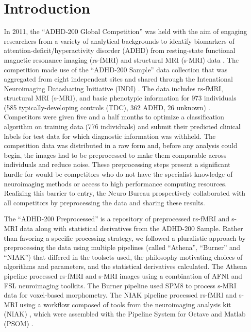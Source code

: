 \documentclass[preprint,12pt,3p]{elsarticle}
\begin{document}
\section{Introduction}

In 2011, the ``ADHD-200 Global Competition'' was held with the aim of engaging researchers from a variety of analytical backgrounds to identify biomarkers of attention-deficit/hyperactivity disorder (ADHD) from resting-state functional magnetic resonance imaging (rs-fMRI) and structural MRI (s-MRI) data \cite{Milham2012}. The competition made use of the ``ADHD-200 Sample'' data collection that was aggregated from eight independent sites and shared through the Intenational Neuroimaging Datasharing Initiative (INDI) \cite{Mennes2013}. The data includes rs-fMRI, structural MRI (s-MRI), and basic phenotypic information for 973 individuals (585 typically-developing controls (TDC), 362 ADHD, 26 unknown) \cite{Milham2012}. Competitors were given five and a half months to optimize a classification algorithm on training data (776 individuals) and submit their predicted clinical labels for test data for which diagnostic information was withheld. The competition data was distributed in a raw form and, before any analysis could begin, the images had to be preprocessed to make them comparable across individuals and reduce noise. These preprocessing steps present a significant hurdle for would-be competitors who do not have the specialist knowledge of neuroimaging methods or access to high performance computing resources. Realizing this barrier to entry, the Neuro Bureau prospectively collaborated with all competitors by preprocessing the data and sharing these results.

The ``ADHD-200 Preprocessed'' is a repository of preprocessed rs-fMRI and s-MRI data along with statistical derivatives from the ADHD-200 Sample. Rather than favoring a specific processing strategy, we followed a pluralistic approach by preprocessing the data using multiple pipelines (called ``Athena'', ``Burner'' and ``NIAK'') that differed in the toolsets used, the philosophy motivating choices of algorithms and parameters, and the statistical derivatives calculated. The Athena pipeline processed rs-fMRI and s-MRI images using a combination of AFNI \cite{cox1996afni} and FSL \cite{smith2004advances} neuroimaging toolkits. The Burner pipeline used SPM8 \cite{ashburner2012spm8} to process s-MRI data for voxel-based morphometry. The NIAK pipeline processed rs-fMRI and s-MRI using a workflow composed of tools from the neuroimaging analysis kit (NIAK) \cite{Bellec2011}, which were assembled with the Pipeline System for Octave and Matlab (PSOM) \cite{Bellec2012}. 
\end{document}
